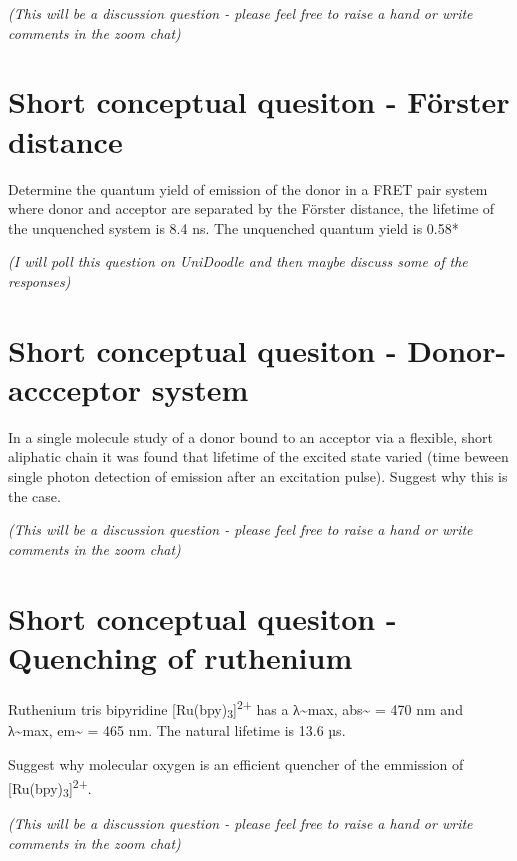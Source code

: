 \documentclass[
]{book}
\begin{document}
\emph{(This will be a discussion question - please feel free to raise a hand or write comments in the zoom chat)}

\hypertarget{sec:FRETdist}{%
\section{Short conceptual quesiton - Förster distance}\label{sec:FRETdist}}

Determine the quantum yield of emission of the donor in a FRET pair system where donor and acceptor are separated by the Förster distance, the lifetime of the unquenched system is 8.4 ns. The unquenched quantum yield is 0.58*

\emph{(I will poll this question on UniDoodle and then maybe discuss some of the responses)}

\hypertarget{sec:donoracceptor}{%
\section{Short conceptual quesiton - Donor-accceptor system}\label{sec:donoracceptor}}

In a single molecule study of a donor bound to an acceptor via a flexible, short aliphatic chain it was found that lifetime of the excited state varied (time beween single photon detection of emission after an excitation pulse). Suggest why this is the case.

\emph{(This will be a discussion question - please feel free to raise a hand or write comments in the zoom chat)}

\hypertarget{sec:ruquench}{%
\section{Short conceptual quesiton - Quenching of ruthenium}\label{sec:ruquench}}

Ruthenium tris bipyridine {[}Ru(bpy)\textsubscript{3}{]}\textsuperscript{2+} has a λ\textasciitilde max, abs\textasciitilde{} = 470 nm and λ\textasciitilde max, em\textasciitilde{} = 465 nm. The natural lifetime is 13.6 µs.

Suggest why molecular oxygen is an efficient quencher of the emmission of {[}Ru(bpy)\textsubscript{3}{]}\textsuperscript{2+}.

\emph{(This will be a discussion question - please feel free to raise a hand or write comments in the zoom chat)}

  
\end{document}
